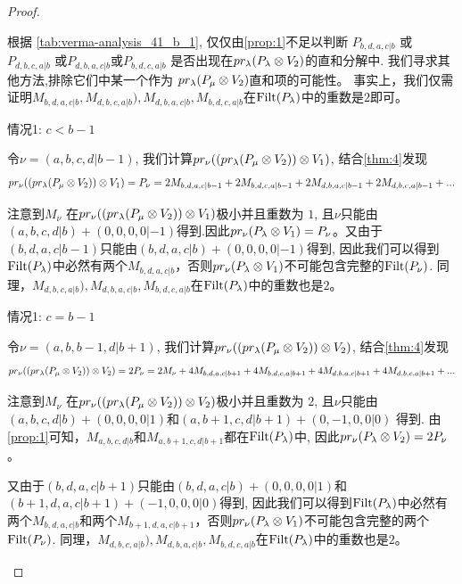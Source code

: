 \begin{proof}
\begin{enumerate}
\begin{enumerate}
\begin{enumerate}
根据 \cref{tab:verma-analysis_41_b_1}, 仅仅由\cref{prop:1}不足以判断 $P_{b,d,a,c|b}$ 或 $P_{d,b,c,a|b}$ 或$P_{d,b,a,c|b}$或$P_{b,d,c,a|b}$ 是否出现在$pr_\lambda(P_\lambda \otimes V_{2})$的直和分解中.
我们寻求其他方法,排除它们中某一个作为 $pr_\lambda(P_\mu \otimes V_{2})$直和项的可能性。
事实上，我们仅需证明$M_{b,d,a,c|b},M_{d,b,c,a|b}),M_{d,b,a,c|b}, M_{b,d,c,a|b}$在$\operatorname{Filt}(P_{\lambda})$中的重数是$2$即可。

情况1: $c < b-1$

令$\nu = (a,b,c,d|b-1)$, 我们计算$pr_\nu ( ( pr_\lambda(P_\mu \otimes V_{2}) ) \otimes V_1 )$, 结合\cref{thm:4}发现
\begin{equation}\notag
  \begin{aligned}
  pr_\nu ( ( pr_\lambda(P_\mu \otimes V_{2}) ) \otimes V_1 ) =
  P_\nu = 2M_{b,d,a,c|b-1} +2 M_{b,d,c,a|b-1}+2M_{d,b,a,c|b-1} +2 M_{d,b,c,a|b-1}  + ...
  \end{aligned}
\end{equation}

注意到$M_\nu$ 在$pr_\nu ( ( pr_\lambda(P_\mu \otimes V_{2}) ) \otimes V_1 )$极小并且重数为 $1$, 且$\nu$只能由$ (a,b,c,d|b) + (0,0,0,0|-1)$得到.因此$pr_\nu(P_\lambda \otimes V_1) = P_\nu$。又由于$(b,d,a,c|b-1)$只能由$(b,d,a,c|b) + (0,0,0,0|-1)$得到, 因此我们可以得到$\operatorname{Filt}(P_{\lambda})$中必然有两个$M_{b,d,a,c|b}$，否则$pr_\nu(P_\lambda \otimes V_1)$不可能包含完整的$\operatorname{Filt}(P_\nu)$. 同理，$M_{d,b,c,a|b}),M_{d,b,a,c|b}, M_{b,d,c,a|b}$在$\operatorname{Filt}(P_{\lambda})$中的重数也是$2$。


情况1: $c = b-1$

令$\nu = (a,b,b-1,d|b+1)$, 我们计算$pr_\nu ( ( pr_\lambda(P_\mu \otimes V_{2}) ) \otimes V_2 )$, 结合\cref{thm:4}发现
\begin{equation}\notag
  \begin{aligned}
  pr_\nu ( ( pr_\lambda(P_\mu \otimes V_{2}) ) \otimes V_2 ) =
  2P_\nu = 2M_\nu + 4M_{b,d,a,c|b+1} + 4M_{b,d,c,a|b+1} + 4M_{d,b,a,c|b+1} + 4M_{d,b,c,a|b+1}  + ...
  \end{aligned}
\end{equation}

注意到$M_\nu$ 在$pr_\nu ( ( pr_\lambda(P_\mu \otimes V_{2}) ) \otimes V_2 )$极小并且重数为 $2$, 且$\nu$只能由$ (a,b,c,d|b) + (0,0,0,0|1)$和$ (a,b+1,c,d|b+1) + (0,-1,0,0|0)$ 得到. 由\cref{prop:1}可知，$M_{a,b,c,d|b}$和$M_{a,b+1,c,d|b+1}$都在$\operatorname{Filt}(P_\lambda)$中,
因此$pr_\nu(P_\lambda \otimes V_2) = 2P_\nu$。

又由于$(b,d,a,c|b+1)$只能由$(b,d,a,c|b) + (0,0,0,0|1)$和$(b+1,d,a,c|b+1) + (-1,0,0,0|0)$得到, 因此我们可以得到$\operatorname{Filt}(P_{\lambda})$中必然有两个$M_{b,d,a,c|b}$和两个$M_{b+1,d,a,c|b+1}$，否则$pr_\nu(P_\lambda \otimes V_1)$不可能包含完整的两个$\operatorname{Filt}(P_\nu)$. 同理，$M_{d,b,c,a|b}),M_{d,b,a,c|b}, M_{b,d,c,a|b}$在$\operatorname{Filt}(P_{\lambda})$中的重数也是$2$。


\end{enumerate}
\end{enumerate}
\end{enumerate}
\end{proof}
